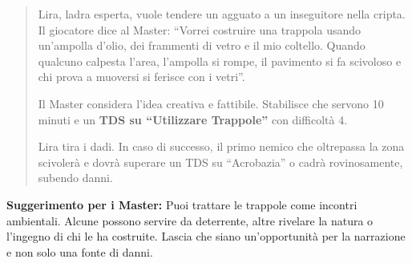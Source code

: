 \documentclass[../manuale_main.tex]{subfiles}
\begin{document}
\begin{quote}
Lira, ladra esperta, vuole tendere un agguato a un inseguitore nella cripta. Il giocatore dice al Master: “Vorrei costruire una trappola usando un’ampolla d’olio, dei frammenti di vetro e il mio coltello. Quando qualcuno calpesta l’area, l’ampolla si rompe, il pavimento si fa scivoloso e chi prova a muoversi si ferisce con i vetri”.

Il Master considera l’idea creativa e fattibile. Stabilisce che servono 10 minuti e un \textbf{TDS su ``Utilizzare Trappole''} con difficoltà 4.

Lira tira i dadi. In caso di successo, il primo nemico che oltrepassa la zona scivolerà e dovrà superare un TDS su “Acrobazia” o cadrà rovinosamente, subendo danni.
\end{quote}

\vspace{0.4cm}
\noindent\textbf{Suggerimento per i Master:} 
Puoi trattare le trappole come incontri ambientali. Alcune possono servire da deterrente, altre rivelare la natura o l’ingegno di chi le ha costruite. Lascia che siano un’opportunità per la narrazione e non solo una fonte di danni.
\end{document}
